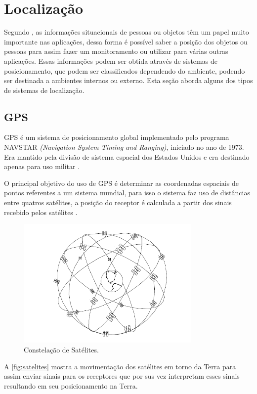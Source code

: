 \section{Localização}
\par
Segundo \citeauthor{rfid2009review}, as informações situacionais de pessoas ou objetos têm um papel muito importante nas aplicações, dessa forma é possível saber a posição dos objetos ou pessoas para assim fazer um monitoramento ou utilizar para várias outras aplicações. Essas informações podem ser obtida através de sistemas de posicionamento, que podem ser classificados dependendo do ambiente, podendo ser destinada a ambientes internos ou externo. Esta seção aborda alguns dos tipos de sistemas de localização.
    \subsection{GPS}
    \par
    GPS é um sistema de posicionamento global implementado pelo programa NAVSTAR \textit{(Navigation System Timing and Ranging)}, iniciado no ano de 1973. Era mantido pela divisão de sistema espacial dos Estados Unidos e era destinado apenas para uso militar \cite{gpsEduardo2005}.
    \par
   O principal objetivo do uso de GPS é determinar as coordenadas espaciais de pontos referentes a um sistema mundial, para isso o sistema faz uso de distâncias entre quatros satélites, a posição do receptor é calculada a partir dos sinais recebido pelos satélites \cite{gpsEduardo2005}.

   \begin{figure}[H]
              \caption{\label{fig:satelites}{Constelação de Satélites.}}
              \centering
              \includegraphics[width=0.8\textwidth]{Figuras/gps_satelites.PNG}
        \end{figure}
        \par
        A  \autoref{fig:satelites} mostra a movimentação dos satélites em torno da Terra para assim enviar sinais para os receptores que por sus vez interpretam esses sinais resultando em seu posicionamento na Terra.
 
